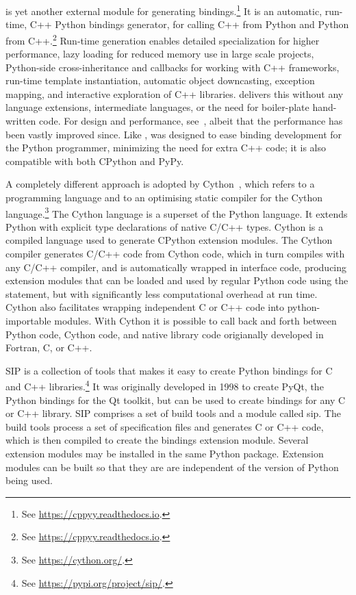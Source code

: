  is yet another external module for generating
bindings.\footnote{See \url{https://cppyy.readthedocs.io}.} It is an
automatic, run-time, C++ Python bindings generator, for calling C++
from Python and Python from
C++.\footnote{See \url{https://cppyy.readthedocs.io}.} Run-time
generation enables detailed specialization for higher performance,
lazy loading for reduced memory use in large scale projects,
Python-side cross-inheritance and callbacks for working with C++
frameworks, run-time template instantiation, automatic object
downcasting, exception mapping, and interactive exploration of C++
libraries.  delivers this without any language
extensions, intermediate languages, or the need for boiler-plate
hand-written code. For design and performance, see~\cite{ld-hppcn-16},
albeit that the  performance has been vastly
improved since.  Like ,  was
designed to ease binding development for the Python programmer,
minimizing the need for extra C++ code; it is also compatible with
both CPython and PyPy.

A completely different approach is adopted by
Cython~\cite{bbcds-cbbw-11}, which refers to a programming language
and to an optimising static compiler for the Cython
language.\footnote{See \url{https://cython.org/}.}  The Cython
language is a superset of the Python language. It extends Python with
explicit type declarations of native C/C++ types.  Cython is a
compiled language used to generate CPython extension modules.  The
Cython compiler generates C/C++ code from Cython code, which in turn
compiles with any C/C++ compiler, and is automatically wrapped in
interface code, producing extension modules that can be loaded and
used by regular Python code using the  statement,
but with significantly less computational overhead at run time. Cython
also facilitates wrapping independent C or C++ code into
python-importable modules.  With Cython it is possible to call back
and forth between Python code, Cython code, and native library code
origianally developed in Fortran, C, or C++.

SIP is a collection of tools that makes it easy to create Python
bindings for C and C++ libraries.\footnote{See
  \url{https://pypi.org/project/sip/}.}  It was originally developed
in 1998 to create PyQt, the Python bindings for the Qt toolkit, but
can be used to create bindings for any C or C++ library. SIP comprises
a set of build tools and a module called sip. The build tools process
a set of specification files and generates C or C++ code, which is then
compiled to create the bindings extension module. Several extension
modules may be installed in the same Python package. Extension modules
can be built so that they are are independent of the version of Python
being used.

